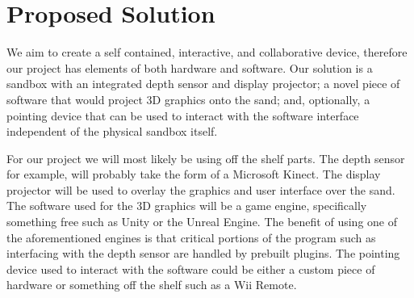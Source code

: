\documentclass[onecolumn, draftclsnofoot,10pt, compsoc]{IEEEtran}
\begin{document}
\section{Proposed Solution}
We aim to create a self contained, interactive, and collaborative device, therefore our project has elements of both hardware and software.
Our solution is a sandbox with an integrated depth sensor and display projector; a novel piece of software that would project 3D graphics onto the sand; and, optionally, a pointing device that can be used to interact with the software interface independent of the physical sandbox itself.
\par
For our project we will most likely be using off the shelf parts.
The depth sensor for example, will probably take the form of a Microsoft Kinect.
The display projector will be used to overlay the graphics and user interface over the sand.
The software used for the 3D graphics will be a game engine, specifically something free such as Unity or the Unreal Engine.
The benefit of using one of the aforementioned engines is that critical portions of the program such as interfacing with the depth sensor are handled by prebuilt plugins.
The pointing device used to interact with the software could be either a custom piece of hardware or something off the shelf such as a Wii Remote.
\end{document}
